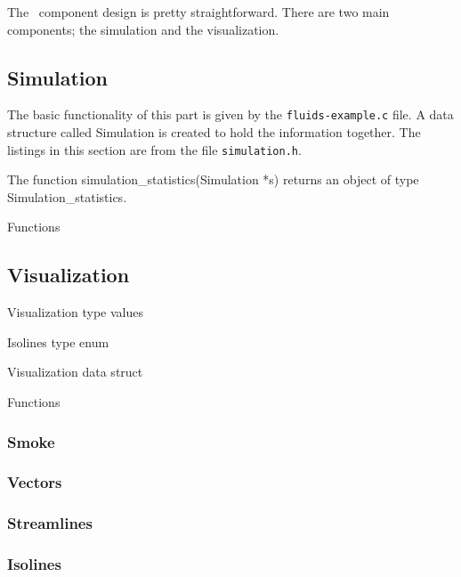 
The \fluids\ component design is pretty straightforward. There are two main
components; the simulation and the visualization. 

\subsection{Simulation}

The basic functionality of this part is given by the \texttt{fluids-example.c}
file. A data structure called Simulation is created to hold the information
together. The listings in this section are from the file \texttt{simulation.h}.



The function simulation\_statistics(Simulation *s) returns an object of type
Simulation\_statistics.



Functions



\subsection{Visualization}

Visualization type values



Isolines type enum



Visualization data struct



Functions



\subsubsection{Smoke}



\subsubsection{Vectors}



\subsubsection{Streamlines}



\subsubsection{Isolines}




